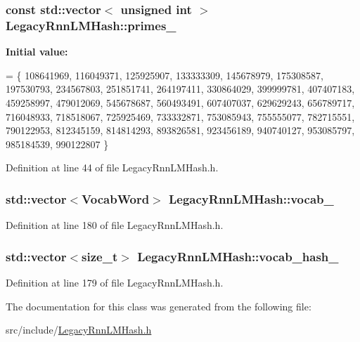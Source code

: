 \subsubsection[{primes\+\_\+}]{\setlength{\rightskip}{0pt plus 5cm}const std\+::vector$<$ unsigned int $>$ Legacy\+Rnn\+L\+M\+Hash\+::primes\+\_\+\hspace{0.3cm}{\ttfamily [static]}}\hypertarget{class_legacy_rnn_l_m_hash_aab92e8f544bba90a0709f094c24d46dc}{}\label{class_legacy_rnn_l_m_hash_aab92e8f544bba90a0709f094c24d46dc}
{\bfseries Initial value\+:}
\begin{DoxyCode}
= \{
  108641969, 116049371, 125925907, 133333309,
  145678979, 175308587, 197530793, 234567803,
  251851741, 264197411, 330864029, 399999781,
  407407183, 459258997, 479012069, 545678687,
  560493491, 607407037, 629629243, 656789717,
  716048933, 718518067, 725925469, 733332871,
  753085943, 755555077, 782715551, 790122953,
  812345159, 814814293, 893826581, 923456189,
  940740127, 953085797, 985184539, 990122807
\}
\end{DoxyCode}


Definition at line 44 of file Legacy\+Rnn\+L\+M\+Hash.\+h.

\subsubsection[{vocab\+\_\+}]{\setlength{\rightskip}{0pt plus 5cm}std\+::vector$<${\bf Vocab\+Word}$>$ Legacy\+Rnn\+L\+M\+Hash\+::vocab\+\_\+}\hypertarget{class_legacy_rnn_l_m_hash_ac3d37fb87e5a699ecba7549f65aec880}{}\label{class_legacy_rnn_l_m_hash_ac3d37fb87e5a699ecba7549f65aec880}


Definition at line 180 of file Legacy\+Rnn\+L\+M\+Hash.\+h.

\subsubsection[{vocab\+\_\+hash\+\_\+}]{\setlength{\rightskip}{0pt plus 5cm}std\+::vector$<$size\+\_\+t$>$ Legacy\+Rnn\+L\+M\+Hash\+::vocab\+\_\+hash\+\_\+}\hypertarget{class_legacy_rnn_l_m_hash_aee87a3acc4cfc872c9e284af3599149c}{}\label{class_legacy_rnn_l_m_hash_aee87a3acc4cfc872c9e284af3599149c}


Definition at line 179 of file Legacy\+Rnn\+L\+M\+Hash.\+h.



The documentation for this class was generated from the following file\+:\begin{DoxyCompactItemize}
\item 
src/include/\hyperlink{_legacy_rnn_l_m_hash_8h}{Legacy\+Rnn\+L\+M\+Hash.\+h}\end{DoxyCompactItemize}
